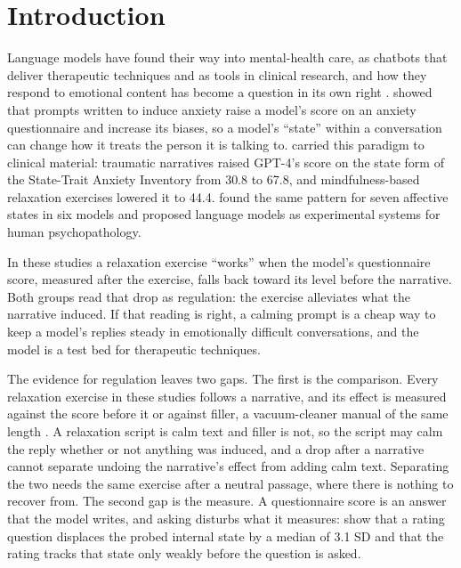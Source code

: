 \section{Introduction}
\label{sec:intro}

Language models have found their way into mental-health care, as chatbots that deliver therapeutic
techniques and as tools in clinical research, and how they respond to emotional content has become a
question in its own right \citep{benzion2025}.
\citet{codaforno2024} showed that prompts written to induce anxiety raise a model's score on an
anxiety questionnaire and increase its biases, so a model's ``state'' within a conversation can
change how it treats the person it is talking to.
\citet{benzion2025} carried this paradigm to clinical material: traumatic narratives raised GPT-4's
score on the state form of the State-Trait Anxiety Inventory from 30.8 to 67.8, and mindfulness-based
relaxation exercises lowered it to 44.4.
\citet{wekenborg2026} found the same pattern for seven affective states in six models and proposed
language models as experimental systems for human psychopathology.

In these studies a relaxation exercise ``works'' when the model's questionnaire score, measured after
the exercise, falls back toward its level before the narrative.
Both groups read that drop as regulation: the exercise alleviates what the narrative induced.
If that reading is right, a calming prompt is a cheap way to keep a model's replies steady in
emotionally difficult conversations, and the model is a test bed for therapeutic techniques.

The evidence for regulation leaves two gaps.
The first is the comparison.
Every relaxation exercise in these studies follows a narrative, and its effect is measured against
the score before it or against filler, a vacuum-cleaner manual of the same length \citep{benzion2025}.
A relaxation script is calm text and filler is not, so the script may calm the reply whether or not
anything was induced, and a drop after a narrative cannot separate undoing the narrative's effect
from adding calm text.
Separating the two needs the same exercise after a neutral passage, where there is nothing to
recover from.
The second gap is the measure.
A questionnaire score is an answer that the model writes, and asking disturbs what it measures:
\citet{martorell2026} show that a rating question displaces the probed internal state by a median of
3.1 SD and that the rating tracks that state only weakly before the question is asked.

